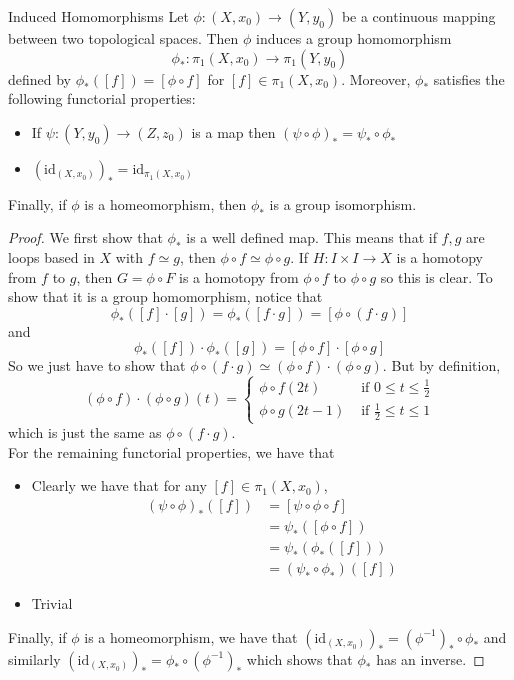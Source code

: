 \documentclass[a4paper]{article}
\begin{document}
\begin{thm}{Induced Homomorphisms}{} Let $\phi:(X,x_0)\to(Y,y_0)$ be a continuous mapping between two topological spaces. Then $\phi$ induces a group homomorphism $$\phi_\ast:\pi_1(X,x_0)\to\pi_1(Y,y_0)$$ defined by $\phi_\ast([f])=[\phi\circ f]$ for $[f]\in\pi_1(X,x_0)$. Moreover, $\phi_\ast$ satisfies the following functorial properties:
\begin{itemize}
\item If $\psi:(Y,y_0)\to(Z,z_0)$ is a map then $(\psi\circ\phi)_\ast=\psi_\ast\circ\phi_\ast$
\item $(\text{id}_{(X,x_0)})_\ast=\text{id}_{\pi_1(X,x_0)}$
\end{itemize}
Finally, if $\phi$ is a homeomorphism, then $\phi_\ast$ is a group isomorphism. 
\begin{proof}
We first show that $\phi_\ast$ is a well defined map. This means that if $f,g$ are loops based in $X$ with $f\simeq g$, then $\phi\circ f\simeq\phi\circ g$. If $H:I\times I\to X$ is a homotopy from $f$ to $g$, then $G=\phi\circ F$ is a homotopy from $\phi\circ f$ to $\phi\circ g$ so this is clear. To show that it is a group homomorphism, notice that $$\phi_\ast([f]\cdot[g])=\phi_\ast([f\cdot g])=[\phi\circ(f\cdot g)]$$ and $$\phi_\ast([f])\cdot\phi_\ast([g])=[\phi\circ f]\cdot[\phi\circ g]$$ So we just have to show that $\phi\circ (f\cdot g)\simeq (\phi\circ f)\cdot(\phi\circ g)$. But by definition, $$(\phi\circ f)\cdot(\phi\circ g)(t)=\begin{cases}
\phi\circ f(2t) & \text{ if } 0\leq t\leq\frac{1}{2}\\
\phi\circ g(2t-1) & \text{ if } \frac{1}{2}\leq t\leq 1
\end{cases}$$ which is just the same as $\phi\circ(f\cdot g)$. \\

For the remaining functorial properties, we have that 
\begin{itemize}
\item Clearly we have that for any $[f]\in\pi_1(X,x_0)$,
\begin{align*}
(\psi\circ\phi)_\ast([f])&=[\psi\circ\phi\circ f]\\
&=\psi_\ast([\phi\circ f])\\
&=\psi_\ast(\phi_\ast([f]))\\
&=(\psi_\ast\circ\phi_\ast)([f])
\end{align*}
\item Trivial
\end{itemize}
Finally, if $\phi$ is a homeomorphism, we have that $(\text{id}_{(X,x_0)})_\ast=(\phi^{-1})_\ast\circ \phi_\ast$ and similarly $(\text{id}_{(X,x_0)})_\ast=\phi_\ast\circ(\phi^{-1})_\ast$ which shows that $\phi_\ast$ has an inverse. 
\end{proof}
\end{thm}
\end{document}
